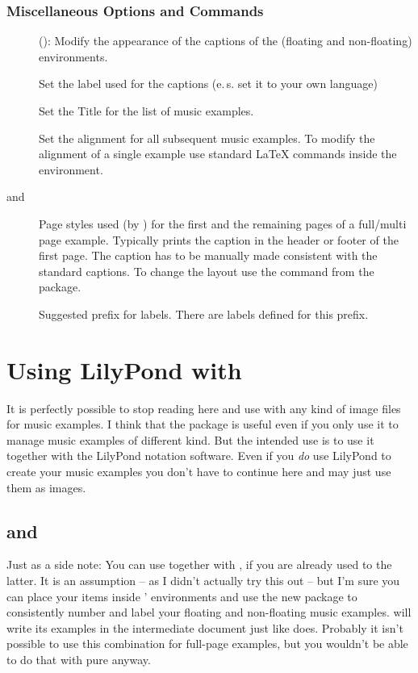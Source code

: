\documentclass[../openLilyLib]{subfiles}
\begin{document}
\subsubsection*{Miscellaneous Options and Commands}
\begin{description}
\item[](): Modify the appearance of the captions of the (floating and non-floating) environments.
\item[]Set the label used for the captions (e.\,s. set it to your own language)
\item[]Set the Title for the list of music examples.
\item[] Set the alignment for all subsequent music examples.
To modify the alignment of a single example use standard \LaTeX{} commands inside the environment.
\item[ and ]Page styles used (by ) for the first and the remaining pages of a full/multi page example. 
Typically prints the caption in the header or footer of the first page.
The caption has to be manually made consistent with the standard captions.
To change the layout use the  command from the  package.
\item[] Suggested prefix for labels.
There are  labels defined for this prefix.
\end{description} 

\section{Using LilyPond with }
\label{sec:xmp_lilypond-configuration}
It is perfectly possible to stop reading here and use  with any kind of image files for music examples.
I think that the package is useful even if you only use it to manage music examples of different kind.
But the intended use is to use it together with the LilyPond notation software.
Even if you \emph{do} use LilyPond to create your music examples you don't have to continue here and may just use them as images.

\subsection{ and }
\label{subsec:xmp_and-lilypond-book}
Just as a side note: You can use  together with , if you are already used to the latter.
It is an assumption -- as I didn't actually try this out -- but I'm sure you can place your  items inside ' environments and use the new package to consistently number and label your floating and non-floating music examples.
 will write its examples in the intermediate document just like  does.
Probably it isn't possible to use this combination for full-page examples, but you wouldn't be able to do that with pure  anyway.
\end{document}
